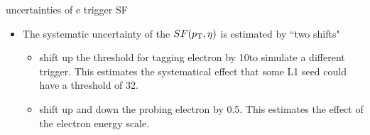 \begin{frame}{uncertainties of e trigger SF}
\begin{itemize}
        \item The systematic uncertainty of the $SF (p_{\mathrm{T}}, \eta)$ is estimated by ``two shifts"
        \begin{itemize}
        \smaller
            \item shift up the \pt threshold for tagging electron by 10\GeV to simulate a different trigger. This estimates the systematical effect that some L1 seed could have a threshold of 32\GeV.
            \item shift up and down the probing electron \pt by 0.5\GeV. This estimates the effect of the electron energy scale.
        \end{itemize}
    \end{itemize}
\end{frame}











